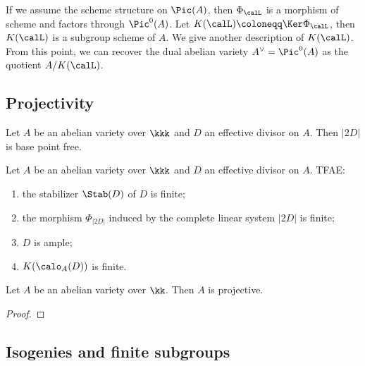     If we assume the scheme structure on \(\Pic(A)\), then \(\Phi_\calL\) is a morphism of scheme and factors through \(\Pic^0(A)\).
    Let \(K(\calL) \coloneqq \Ker \Phi_\calL\), then \(K(\calL)\) is a subgroup scheme of \(A\).
    We give another description of \(K(\calL)\).
    From this point, we can recover the dual abelian variety \(A^\vee = \Pic^0(A)\) as the quotient \(A/K(\calL)\).



\subsection{Projectivity}

    \begin{proposition}\label{prop:2D_is_base_point_free}
        Let \(A\) be an abelian variety over \(\kkk\) and \(D\) an effective divisor on \(A\).
        Then \(|2D|\) is base point free.
    \end{proposition}

    \begin{theorem}\label{thm:ample_criteria_for_abelian_varieties}
        Let \(A\) be an abelian variety over \(\kkk\) and \(D\) an effective divisor on \(A\).
        TFAE:
        \begin{enumerate}
            \item the stabilizer \(\Stab(D)\) of \(D\) is finite;
            \item the morphism \(\Phi_{|2D|}\) induced by the complete linear system \(|2D|\) is finite;
            \item \(D\) is ample;
            \item \(K(\calo_A(D))\) is finite.
        \end{enumerate}
    \end{theorem}

    \begin{theorem}\label{thm: abelian varieties are projective}
        Let $A$ be an abelian variety over $\kk$. 
        Then $A$ is projective.
    \end{theorem}
    \begin{proof}
    \end{proof}


\subsection{Isogenies and finite subgroups}

